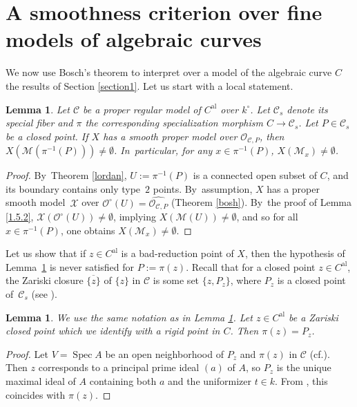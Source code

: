 \documentclass[10pt]{amsart}
\newcommand{\cf}{cf.}
\newcommand{\al}{\mathrm{al}}
\DeclareMathOperator{\Spec}{Spec}
\newtheorem{lm}[thm]{Lemma}
\theoremstyle{definition}
\begin{document}
\section{A smoothness criterion over fine models of algebraic curves} \label{seksioni2}
We now use Bosch's theorem to interpret over a model of the algebraic curve $C$ the results of Section \ref{section1}. Let us start with a local statement.

\begin{lm} \label{2.1} Let $\mathcal{C}$ be a proper regular model of $C^{\al}$ over $k^{\circ}$. Let $\mathcal{C}_s$ denote its special fiber and $\pi$ the corresponding specialization morphism $C \to \mathcal{C}_s$.
Let $P \in \mathcal{C}_s$ be a closed point. If $X$ has a smooth proper model over $\mathcal{O}_{\mathcal{C}, P}$, then $X(\mathscr{M}(\pi^{-1}(P))) \neq \emptyset$. In~particular, for any $x \in \pi^{-1}(P)$, $X(\mathscr{M}_x) \neq \emptyset$.
\end{lm}

\begin{proof}
By~Theorem \ref{lordan}, $U:=\pi^{-1}(P)$ is a connected open subset of $C$, and its boundary contains only type~$2$ points. By~assumption, $X$ has a proper smooth model~$\mathcal{X}$ over $\mathcal{O}^{\circ}(U)=\widehat{\mathcal{O}_{\mathcal{C}, P}}$ (Theorem \ref{bosh}). By~the proof of Lemma \ref{1.5.2}, $\mathcal{X}(\mathcal{O}^{\circ}(U)) \neq \emptyset$, implying $X(\mathscr{M}(U)) \neq \emptyset$, and so for all $x \in \pi^{-1}(P)$, one obtains $X(\mathscr{M}_x) \neq \emptyset$.
\end{proof}

Let us show that if $z \in C^{\al}$ is a bad-reduction point of $X$, then the hypothesis of Lemma~\ref{2.1} is never satisfied for $P:=\pi(z)$. Recall that for a closed point $z \in C^{\al}$, the Zariski closure $\overline{\{z\}}$ of $\{z\}$ in $\mathcal{C}$ is some set $\{z, P_z\}$, where $P_z$ is a closed point of~$\mathcal{C}_s$ (see \cite[Def.\,10.1.31]{liulibri}).

\begin{lm} \label{2.2} We use the same notation as in Lemma \ref{2.1}.
Let $z \in C^{\al}$ be a Zariski closed point which we identify with a rigid point in $C$. Then ${\pi(z)=P_z}$.
\end{lm}

\begin{proof}
Let $V=\Spec A$ be an open neighborhood of $P_z$ and $\pi(z)$ in $\mathcal{C}$ (\cf \cite[2.2]{gabber}). Then $z$ corresponds to a principal prime ideal $(a)$ of $A$, so $P_z$ is the unique maximal ideal of $A$ containing both $a$ and the uniformizer $t \in k$.
From \cite[7.1.10]{dejong}, this coincides with $\pi(z)$.
\end{proof}
\end{document}
